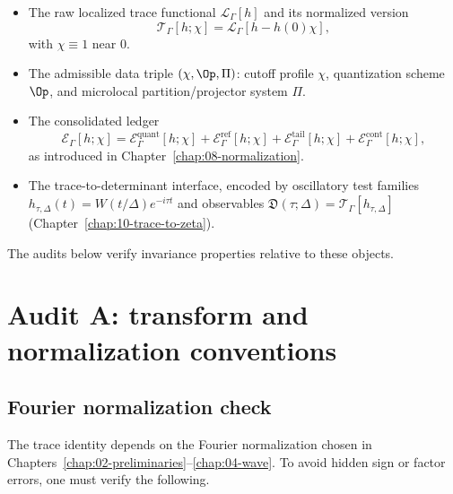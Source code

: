 \begin{itemize}
\item The raw localized trace functional $\mathcal{L}_\Gamma[h]$ and its normalized version
\[
\mathcal{T}_\Gamma[h;\chi]=\mathcal{L}_\Gamma[h-h(0)\chi],
\]
with $\chi\equiv 1$ near $0$.

\item The admissible data triple $(\chi,\Op,\Pi)$: cutoff profile $\chi$, quantization scheme $\Op$, and microlocal
partition/projector system $\Pi$.

\item The consolidated ledger
\[
\mathcal{E}_\Gamma[h;\chi]
=
\mathcal{E}^{\mathrm{quant}}_\Gamma[h;\chi]
+
\mathcal{E}^{\mathrm{ref}}_\Gamma[h;\chi]
+
\mathcal{E}^{\mathrm{tail}}_\Gamma[h;\chi]
+
\mathcal{E}^{\mathrm{cont}}_\Gamma[h;\chi],
\]
as introduced in Chapter~\ref{chap:08-normalization}.

\item The trace-to-determinant interface, encoded by oscillatory test families
$h_{\tau,\Delta}(t)=W(t/\Delta)e^{-i\tau t}$ and observables
$\mathfrak{D}(\tau;\Delta)=\mathcal{T}_\Gamma[h_{\tau,\Delta}]$ (Chapter~\ref{chap:10-trace-to-zeta}).

\end{itemize}

The audits below verify invariance properties relative to these objects.

\section{Audit A: transform and normalization conventions}
\label{sec:E.audit.transform}

\subsection{Fourier normalization check}
\label{subsec:E.fourier}

The trace identity depends on the Fourier normalization chosen in Chapters~\ref{chap:02-preliminaries}--\ref{chap:04-wave}.
To avoid hidden sign or factor errors, one must verify the following.

